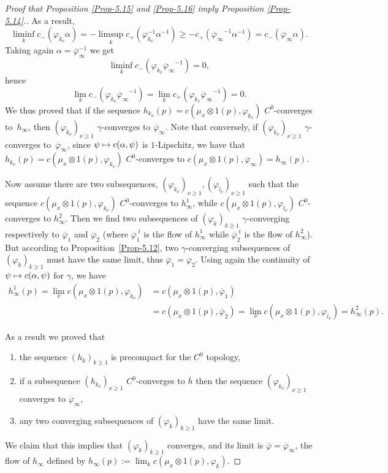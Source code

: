 \documentclass[JEP,XML,SOM,NoFloatCountersInSection,Unicode,published]{cedram}
\newenvironment{enumeratea}
{\bgroup\def\theenumi{\alph{enumi}}\begin{enumerate}}
{\end{enumerate}\egroup}
\newcommand\mto{\mathchoice{\longmapsto}{\mapsto}{\mapsto}{\mapsto}}
\numberwithin{equation}{section}
\let \varpsi \varphi
\let \phi \varphi
\theoremstyle{plain}
\theoremstyle{definition}
\theoremstyle{remark}
\begin{document}
\begin{proof} [ Proof that Proposition \ref{Prop-5.15} and \ref{Prop-5.16} imply
Proposition \ref{Prop-5.14}.]
As a result,
\[
\liminf_{k} c_-(\varphi_{k_{\nu}}\alpha) =
- \limsup_{k} c_+(\varphi_{k_{\nu}}^{-1}\alpha^{-1})\geq - c _+({\overline\varpsi_\infty}^{-1}\alpha^{-1})
= c_-(\overline\varpsi_\infty \alpha).
\]
Taking again $\alpha=\overline\varphi_\infty^{-1}$ we get
\[
\liminf_{k} c_-(\varphi_{k_{\nu}}{\overline\varpsi_\infty}^{-1}) =0,
\]
hence
\[
\lim_{k} c_-(\varphi_{k_{\nu}}{\overline\varpsi_\infty}^{-1}) =\lim_{k} c_+(\varphi_{k_{\nu}}{\overline\varpsi_\infty}^{-1}) =0.
\]
We thus proved that if the sequence $h_{k_{\nu}}(p)=c(\mu_{x}\otimes 1(p),\phi_{k_{\nu}})$ $C^0$-converges to~$h_{\infty}$, then
$(\phi_{k_{\nu}})_{\nu \geq 1}$ $\gamma$-converges to $\overline\varpsi_\infty$. Note that conversely, if $(\phi_{k_{\nu}})_{\nu \geq 1}$ $\gamma$-converges to~$\overline\varpsi_\infty$, since $ \psi \mto c(\alpha, \psi)$ is $1$-Lipschitz, we have that
$h_{k_{\nu}}(p)=c(\mu_{x}\otimes 1(p),\phi_{k_{\nu}})$ $C^0$\nobreakdash-con\-verges to $c(\mu_x\otimes 1(p),{\overline\varpsi_\infty})=h_{\infty}(p)$.

Now assume there are two subsequences, $(\phi_{k_{\nu}})_{\nu \geq 1},(\phi_{l_{\nu}})_{\nu \geq 1}$ such that the sequence \hbox{$c(\mu_{x}\otimes 1(p),\phi_{k_{\nu}})$} $C^0$-converges to $h^{1}_{\infty}$, while $c(\mu_{x}\otimes 1(p),\phi_{l_{\nu}})$ $C^0$\nobreakdash-con\-verges to $h^{2}_{\infty}$. Then we find two subsequences of $(\phi_{k})_{k\geq 1}$ $\gamma$-converging respectively to $\overline \varpsi_{1}$ and $\overline \varpsi_{2}$ (where $\overline \varpsi_{1}^{\;t}$ is the flow of $h^{1}_{\infty}$ while $\overline \phi_{2}^{\;t}$ is the flow of $h^{2}_{\infty}$). But according to Proposition~\ref{Prop-5.12}, two $\gamma$-converging subsequences of $(\phi_{k})_{k\geq 1}$ must have the same limit, thus $\overline \varpsi_{1}=\overline \varpsi_{2}$. Using again the continuity of $\psi \mto c(\alpha,\psi)$ for $\gamma$, we have
\begin{align*}
h^{1}_{\infty}(p)=\lim_\nu c(\mu_x\otimes 1(p), \varphi_{k_\nu})&=c(\mu_x\otimes 1(p), \overline\varphi_{1})\\ &=c(\mu_x\otimes 1(p), \overline\varphi_{2})=\lim_\nu c(\mu_x\otimes 1(p), \varphi_{l_\nu})=h^{2}_{\infty}(p).
\end{align*}

As a result we proved that
\begin{enumeratea}
\item \label{a} the sequence $(h_k)_{k\geq 1}$ is precompact for the $C^0$ topology,
\item \label{b} if a subsequence $(h_{k_\nu})_{\nu\geq 1}$ $C^0$-converges to $\overline h$ then the sequence $(\varphi_{k_\nu})_{\nu\geq 1}$ converges to $\overline\varphi_\infty$,
\item\label{c} any two converging subsequences of $(\varphi_{k})_{k\geq 1}$ have the same limit.
\end{enumeratea}
We claim that this implies that $(\varphi_{k})_{k\geq 1}$ converges, and its limit is $\overline \varphi=\overline \varphi_\infty$, the flow of $h_\infty$ defined by $h_\infty(p):=\lim_k c(\mu_x\otimes 1(p), \varphi_k)$.


\end{proof}
\end{document}
